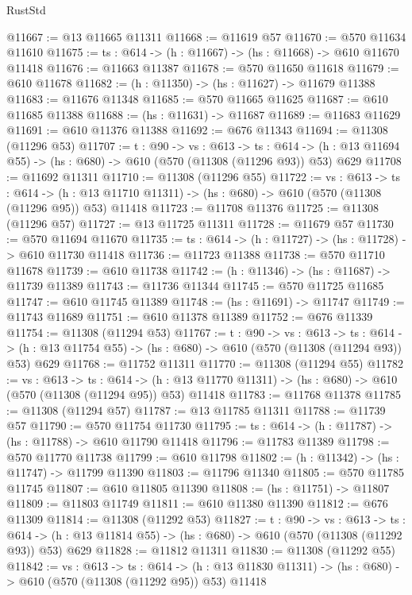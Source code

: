 \begin{lexlean}{RustStd}
\begin{coremodule}
@11667 := @13 @11665 @11311
@11668 := @11619 @57
@11670 := @570 @11634 @11610
@11675 := {ts : @614} -> (h : @11667) -> (hs : @11668) -> @610 @11670 @11418
@11676 := @11663 @11387
@11678 := @570 @11650 @11618
@11679 := @610 @11678
@11682 := (h : @11350) -> (hs : @11627) -> @11679 @11388
@11683 := @11676 @11348
@11685 := @570 @11665 @11625
@11687 := @610 @11685 @11388
@11688 := (hs : @11631) -> @11687
@11689 := @11683 @11629
@11691 := @610 @11376 @11388
@11692 := @676 @11343
@11694 := @11308 (@11296 @53)
@11707 := {t : @90} ->
  {vs : @613} ->
  {ts : @614} -> (h : @13 @11694 @55) -> (hs : @680) -> @610 (@570 (@11308 (@11296 @93)) @53) @629
@11708 := @11692 @11311
@11710 := @11308 (@11296 @55)
@11722 := {vs : @613} ->
  {ts : @614} ->
  (h : @13 @11710 @11311) -> (hs : @680) -> @610 (@570 (@11308 (@11296 @95)) @53) @11418
@11723 := @11708 @11376
@11725 := @11308 (@11296 @57)
@11727 := @13 @11725 @11311
@11728 := @11679 @57
@11730 := @570 @11694 @11670
@11735 := {ts : @614} -> (h : @11727) -> (hs : @11728) -> @610 @11730 @11418
@11736 := @11723 @11388
@11738 := @570 @11710 @11678
@11739 := @610 @11738
@11742 := (h : @11346) -> (hs : @11687) -> @11739 @11389
@11743 := @11736 @11344
@11745 := @570 @11725 @11685
@11747 := @610 @11745 @11389
@11748 := (hs : @11691) -> @11747
@11749 := @11743 @11689
@11751 := @610 @11378 @11389
@11752 := @676 @11339
@11754 := @11308 (@11294 @53)
@11767 := {t : @90} ->
  {vs : @613} ->
  {ts : @614} -> (h : @13 @11754 @55) -> (hs : @680) -> @610 (@570 (@11308 (@11294 @93)) @53) @629
@11768 := @11752 @11311
@11770 := @11308 (@11294 @55)
@11782 := {vs : @613} ->
  {ts : @614} ->
  (h : @13 @11770 @11311) -> (hs : @680) -> @610 (@570 (@11308 (@11294 @95)) @53) @11418
@11783 := @11768 @11378
@11785 := @11308 (@11294 @57)
@11787 := @13 @11785 @11311
@11788 := @11739 @57
@11790 := @570 @11754 @11730
@11795 := {ts : @614} -> (h : @11787) -> (hs : @11788) -> @610 @11790 @11418
@11796 := @11783 @11389
@11798 := @570 @11770 @11738
@11799 := @610 @11798
@11802 := (h : @11342) -> (hs : @11747) -> @11799 @11390
@11803 := @11796 @11340
@11805 := @570 @11785 @11745
@11807 := @610 @11805 @11390
@11808 := (hs : @11751) -> @11807
@11809 := @11803 @11749
@11811 := @610 @11380 @11390
@11812 := @676 @11309
@11814 := @11308 (@11292 @53)
@11827 := {t : @90} ->
  {vs : @613} ->
  {ts : @614} -> (h : @13 @11814 @55) -> (hs : @680) -> @610 (@570 (@11308 (@11292 @93)) @53) @629
@11828 := @11812 @11311
@11830 := @11308 (@11292 @55)
@11842 := {vs : @613} ->
  {ts : @614} ->
  (h : @13 @11830 @11311) -> (hs : @680) -> @610 (@570 (@11308 (@11292 @95)) @53) @11418

\end{coremodule}
\end{lexlean}
